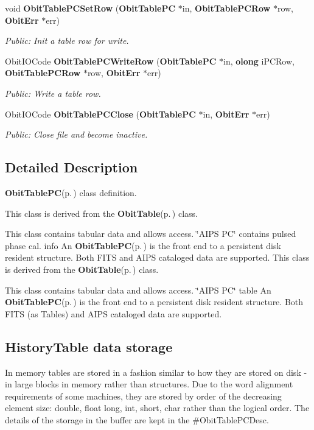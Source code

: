 \begin{CompactItemize}
void {\bf Obit\-Table\-PCSet\-Row} ({\bf Obit\-Table\-PC} $\ast$in, {\bf Obit\-Table\-PCRow} $\ast$row, {\bf Obit\-Err} $\ast$err)
\begin{CompactList}\small\item\em Public: Init a table row for write. \item\end{CompactList}\item 
Obit\-IOCode {\bf Obit\-Table\-PCWrite\-Row} ({\bf Obit\-Table\-PC} $\ast$in, {\bf olong} i\-PCRow, {\bf Obit\-Table\-PCRow} $\ast$row, {\bf Obit\-Err} $\ast$err)
\begin{CompactList}\small\item\em Public: Write a table row. \item\end{CompactList}\item 
Obit\-IOCode {\bf Obit\-Table\-PCClose} ({\bf Obit\-Table\-PC} $\ast$in, {\bf Obit\-Err} $\ast$err)
\begin{CompactList}\small\item\em Public: Close file and become inactive. \item\end{CompactList}\end{CompactItemize}


\subsection{Detailed Description}
{\bf Obit\-Table\-PC}{\rm (p.\,\pageref{structObitTablePC})} class definition. 

This class is derived from the {\bf Obit\-Table}{\rm (p.\,\pageref{structObitTable})} class.

This class contains tabular data and allows access. \char`\"{}AIPS PC\char`\"{} contains pulsed phase cal. info An {\bf Obit\-Table\-PC}{\rm (p.\,\pageref{structObitTablePC})} is the front end to a persistent disk resident structure. Both FITS and AIPS cataloged data are supported. This class is derived from the {\bf Obit\-Table}{\rm (p.\,\pageref{structObitTable})} class.

This class contains tabular data and allows access. \char`\"{}AIPS PC\char`\"{} table An {\bf Obit\-Table\-PC}{\rm (p.\,\pageref{structObitTablePC})} is the front end to a persistent disk resident structure. Both FITS (as Tables) and AIPS cataloged data are supported.\subsection{History\-Table data storage}\label{ObitTableWX_8h_TableDataStorage}
In memory tables are stored in a fashion similar to how they are stored on disk - in large blocks in memory rather than structures. Due to the word alignment requirements of some machines, they are stored by order of the decreasing element size: double, float long, int, short, char rather than the logical order. The details of the storage in the buffer are kept in the \#Obit\-Table\-PCDesc.


